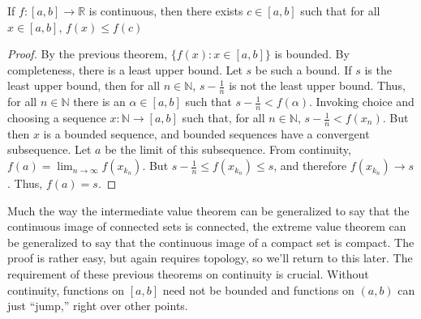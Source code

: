 \documentclass[crop=false,class=book,oneside]{standalone}
\begin{document}
            \begin{theorem}
                If $f:[a,b]\rightarrow\mathbb{R}$ is
                continuous, then there exists $c\in[a,b]$
                such that for all $x\in[a,b]$,
                $f(x)\leq{f(c)}$
            \end{theorem}
            \begin{proof}
                By the previous theorem,
                $\{f(x):x\in[a,b]\}$ is bounded.
                By completeness, there is a least upper
                bound. Let $s$ be such
                a bound. If $s$ is the least upper bound,
                then for all $n\in\mathbb{N}$, $s-\frac{1}{n}$
                is not the least upper bound. Thus, for
                all $n\in\mathbb{N}$ there is an $\alpha\in[a,b]$
                such that
                $s-\frac{1}{n}<f(\alpha)$. Invoking choice and
                choosing a sequence $x:\mathbb{N}\rightarrow[a,b]$ such
                that, for all $n\in\mathbb{N}$, $s-\frac{1}{n}<f(x_{n})$.
                But then $x$
                is a bounded sequence, and bounded
                sequences have a convergent subsequence.
                Let $a$ be the limit of this subsequence.
                From continuity,
                $f(a)=\lim_{n\rightarrow\infty}f(x_{k_{n}})$.
                But $s-\frac{1}{n}\leq{f(x_{k_{n}})}\leq{s}$,
                and therefore $f(x_{k_{n}})\rightarrow{s}$.
                Thus, $f(a)=s$.
            \end{proof}
            Much the way the intermediate value theorem can be
            generalized to say that the continuous image of
            connected sets is connected, the extreme value
            theorem can be generalized to say that the
            continuous image of a compact set is compact.
            The proof is rather easy, but again
            requires topology, so we'll return to this later.
            The requirement of these previous theorems on
            continuity is crucial. Without continuity, functions
            on $[a,b]$ need not be bounded and functions on
            $(a,b)$ can just ``jump,'' right over other points.
\end{document}

